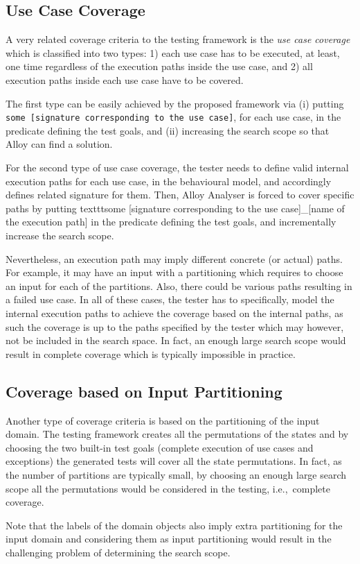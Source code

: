 \subsection{Use Case Coverage}
\label{sec:case-study-usecase-coverage}
A very related coverage criteria to the testing framework is the \textit{use case coverage} which is classified into two types: 1) each use case has to be executed, at least, one time regardless of the execution paths inside the use case, and 2) all execution paths inside each use case have to be covered.

The first type can be easily achieved by the proposed framework via (i) putting \texttt{some [signature corresponding to the use case]}, for each use case, in the predicate defining the test goals, and (ii) increasing the search scope so that Alloy can find a solution. 

For the second type of use case coverage, the tester needs to define valid internal execution paths for each use case, in the behavioural model, and accordingly defines related signature for them. Then, Alloy Analyser is forced to cover specific paths by putting texttt{some [signature corresponding to the use case]\_[name of the execution path]} in the predicate defining the test goals, and incrementally increase the search scope.

Nevertheless, an execution path may imply different concrete (or actual) paths. For example, it may have an input with a partitioning which requires to choose an input for each of the partitions. Also, there could be various paths resulting in a failed use case. In all of these cases, the tester has to specifically, model the internal execution paths to achieve the coverage  based on the internal paths, as such the coverage is up to the paths specified by the tester which may however, not be included in the search space. In fact, an enough large search scope would result in complete coverage which is typically impossible in practice.

\subsection{Coverage based on Input Partitioning}
\label{sec:case-study-partitioning-coverage}
Another type of coverage criteria is based on the partitioning of the input domain. The testing framework creates all the permutations of the states and by choosing the two built-in test goals (complete execution of use cases and exceptions) the generated tests will cover all the state permutations. In fact, as the number of partitions are typically small, by choosing an enough large search scope all the permutations would be considered in the testing, i.e.,\ complete coverage.

Note that the labels of the domain objects also imply extra partitioning for the input domain and considering them as input partitioning would result in the challenging problem of determining the search scope.